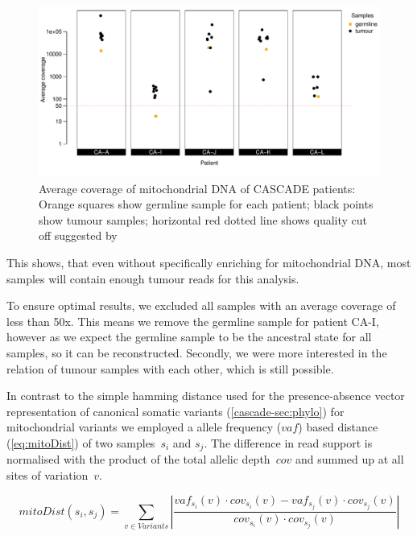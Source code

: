 \begin{figure}[!ht]
\centering
\includegraphics[width=.99\linewidth]{Figures/CASCADE/mito/mtCoverage}
\vspace{-1em}
\caption[Average coverage of mitochondrial DNA of CASCADE patients]{Average coverage of mitochondrial DNA of CASCADE patients: Orange squares show germline sample for each patient; black points show tumour samples; horizontal red dotted line shows quality cut off suggested by \protect\textcite{Ludwig2019}} \label{fig:mtCoverage}
\end{figure}

This shows, that even without specifically enriching for mitochondrial DNA, most samples will contain enough tumour reads for this analysis.

To ensure optimal results, we excluded all samples with an average coverage of less than 50x. This means we remove the germline sample for patient CA-I, however as we expect the germline sample to be the ancestral state for all samples, so it can be reconstructed. Secondly, we were more interested in the relation of tumour samples with each other, which is still possible.

In contrast to the simple hamming distance used for the presence-absence vector representation of canonical somatic variants (\autoref{cascade-sec:phylo}) for mitochondrial variants we employed a allele frequency ($vaf$) based distance (\autoref{eq:mitoDist}) of two samples~$s_i$ and $s_j$. The difference in read support is normalised with the product of the total allelic depth~$cov$ and summed up at all sites of variation~$v$.

\begin{equation}
mitoDist(s_i,s_j) = \sum_{v \in Variants} \left| \frac{vaf_{s_i}(v) \cdot cov_{s_i}(v) - vaf_{s_j}(v) \cdot cov_{s_j}(v)}{cov_{s_i}(v) \cdot cov_{s_j}(v)} \right| \label{eq:mitoDist}
\end{equation}
\myequation[\ref{eq:mitoDist}]{Mitochondrial variants based distance function of two samples}

